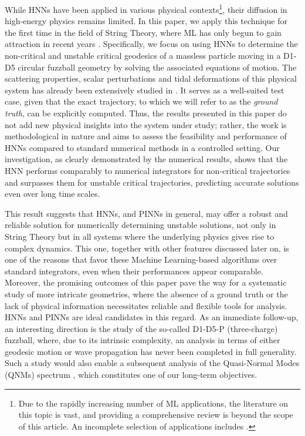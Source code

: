 \documentclass[prd,aps,a4paper,eqsecnum,nofootinbib,floatfix,twocolumn,superscriptaddress]{revtex4-2}
\begin{document}
While HNNs have been applied in various physical contexts\footnote{Due to the rapidly increasing number of ML applications, the literature on this topic is vast, and providing a comprehensive review is beyond the scope of this article. An incomplete selection of applications includes \cite{Crammer:2020,DiHan:2021,Greydanus:2019,deveney:2021,raissi:2017,Wu:2022,Cornell:2022enn,Jain:2022dsh,Luna:2022rql,Luna:2024spo,Geng:2024zzw,Louppe:2017ipp,Nabian:2020,Hashemi:2024azx,Lagaris_1998}.}, their diffusion in high-energy physics remains limited. In this paper, we apply this technique for the first time in the field of String Theory, where ML has only begun to gain attraction in recent years \cite{Cole:2019enn,Cole:2021nnt,MacFadden:2024him,Lanza:2023vee,Lanza:2024mqp,Deen:2020dlf,PhysRevD.111.086007,Ashmore:2019wzb,Jejjala:2020wcc,Larfors:2021pbb,Berglund:2022gvm,Berglund:2023ztk,Anderson:2023viv,Hendi:2024yin,Mirjanic:2024gek,Seong:2023njx,Choi:2023rqg,Seong:2024wkt,He:2024jao}. Specifically, we focus on using HNNs to determine the non-critical and unstable critical geodesics of a massless particle moving in a D1-D5 circular fuzzball geometry by solving the associated equations of motion. The scattering properties, scalar perturbations and tidal deformations of this physical system has already been extensively studied in \cite{Bianchi:2017sds,Bianchi:2022qph,DiRusso:2024hmd}. It serves as a well-suited test case, given that the exact trajectory, to which we will refer to as the \textit{ground truth}, can be explicitly computed. Thus, the results presented in this paper do not add new physical insights into the system under study; rather, the work is methodological in nature and aims to assess the feasibility and performance of HNNs compared to standard numerical methods in a controlled setting. Our investigation, as clearly demonstrated by the numerical results, shows that the HNN performs comparably to numerical integrators for non-critical trajectories and surpasses them for unstable critical trajectories, predicting accurate solutions even over long time scales.

This result suggests that HNNs, and PINNs in general, may offer a robust and reliable solution for numerically determining unstable solutions, not only in String Theory but in all systems where the underlying physics gives rise to complex dynamics. This one, together with other features discussed later on, is one of the reasons that favor these Machine Learning-based algorithms over standard integrators, even when their performances appear comparable. Moreover, the promising outcomes of this paper pave the way for a systematic study of more intricate geometries, where the absence of a ground truth or the lack of physical information necessitates reliable and flexible tools for analysis. HNNs and PINNs are ideal candidates in this regard. As an immediate follow-up, an interesting direction is the study of the so-called D1-D5-P (three-charge) fuzzball, where, due to its intrinsic complexity, an analysis in terms of either geodesic motion or wave propagation has never been completed in full generality. Such a study would also enable a subsequent analysis of the Quasi-Normal Modes (QNMs) spectrum \cite{Bianchi:2023rlt,Bianchi:2023sfs,Cipriani:2024ygw}, which constitutes one of our long-term objectives.
\end{document}
